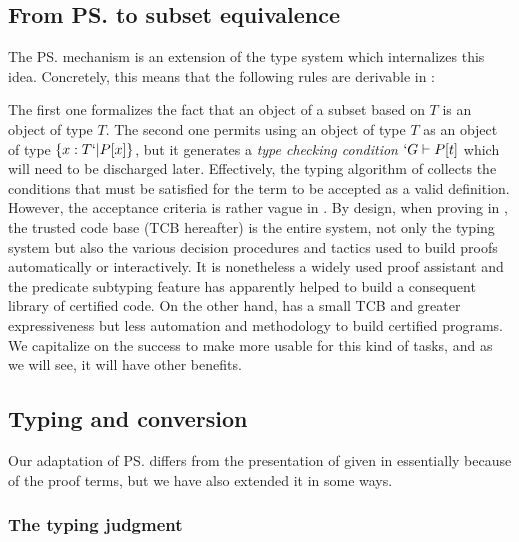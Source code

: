 \documentclass[twocolumn]{article}
\begin{document}
\subsection{From \ps{} to subset equivalence}
The \ps{} mechanism \cite{Rushby98:TSE, Shankar&Owre:WADT99}
is an extension of the \PVS type system which internalizes this idea.
Concretely, this means that the following rules are derivable in \PVS:
\begin{figure}[h]
  \begin{center}
    \DP
    \DP
  \end{center}
  \vspace{-1em}
  \label{PVS:rules}
  \caption{\PVS}
\end{figure}

The first one formalizes the fact that an object of a subset based on
$T$ is an object of type $T$. The second one permits using an object of
type $T$ as an object of type $\{ x : T `| P[x] \}$, but it generates a
\emph{type checking condition} $`G \vdash P[t]$ which will need to be
discharged later. Effectively, the typing algorithm of \PVS{} collects
the conditions that must be satisfied for the term to be accepted as a
valid definition. However, the acceptance criteria is rather vague in
\PVS{}. By design, when proving in \PVS{}, the trusted code base (TCB
hereafter) is the entire system, not only the typing system but also the
various decision procedures and tactics used to build proofs
automatically or interactively. It is nonetheless a widely used proof
assistant and the predicate subtyping feature has apparently helped to
build a consequent library of certified code. On the other hand, \Coq
has a small TCB and greater expressiveness but less automation and
methodology to build certified programs. We capitalize on the \PVS
success to make \Coq more usable for this kind of tasks, and as we will see,
it will have other benefits.

\subsection{Typing and conversion}
Our adaptation of \ps{} differs from the presentation of
given in \cite{Rushby98:TSE, Shankar&Owre:WADT99} essentially because of the
proof terms, but we have also extended it in some ways. 

\subsubsection{The typing judgment}
\end{document}
